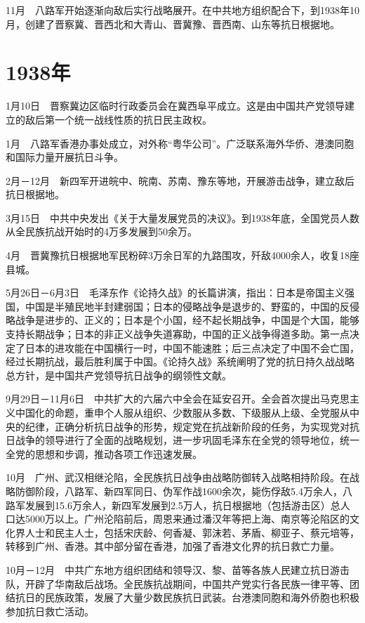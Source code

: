 \documentclass[10pt,a4paper,twocolumn]{book}
\begin{document}
11月　八路军开始逐渐向敌后实行战略展开。在中共地方组织配合下，到1938年10月，创建了晋察冀、晋西北和大青山、晋冀豫、晋西南、山东等抗日根据地。

\section{1938年}

1月10日　晋察冀边区临时行政委员会在冀西阜平成立。这是由中国共产党领导建立的敌后第一个统一战线性质的抗日民主政权。

1月　八路军香港办事处成立，对外称“粤华公司”。广泛联系海外华侨、港澳同胞和国际力量开展抗日斗争。

2月－12月　新四军开进皖中、皖南、苏南、豫东等地，开展游击战争，建立敌后抗日根据地。

3月15日　中共中央发出《关于大量发展党员的决议》。到1938年底，全国党员人数从全民族抗战开始时的4万多发展到50余万。

4月　晋冀豫抗日根据地军民粉碎3万余日军的九路围攻，歼敌4000余人，收复18座县城。

5月26日－6月3日　毛泽东作《论持久战》的长篇讲演，指出：日本是帝国主义强国，中国是半殖民地半封建弱国；日本的侵略战争是退步的、野蛮的，中国的反侵略战争是进步的、正义的；日本是个小国，经不起长期战争，中国是个大国，能够支持长期战争；日本的非正义战争失道寡助，中国的正义战争得道多助。第一点决定了日本的进攻能在中国横行一时，中国不能速胜；后三点决定了中国不会亡国，经过长期抗战，最后胜利属于中国。《论持久战》系统阐明了党的抗日持久战战略总方针，是中国共产党领导抗日战争的纲领性文献。

9月29日－11月6日　中共扩大的六届六中全会在延安召开。全会首次提出马克思主义中国化的命题，重申个人服从组织、少数服从多数、下级服从上级、全党服从中央的纪律，正确分析抗日战争的形势，规定党在抗战新阶段的任务，为实现党对抗日战争的领导进行了全面的战略规划，进一步巩固毛泽东在全党的领导地位，统一全党的思想和步调，推动各项工作迅速发展。

10月　广州、武汉相继沦陷，全民族抗日战争由战略防御转入战略相持阶段。在战略防御阶段，八路军、新四军同日、伪军作战1600余次，毙伤俘敌5.4万余人，八路军发展到15.6万余人，新四军发展到2.5万人，抗日根据地（包括游击区）总人口达5000万以上。广州沦陷前后，周恩来通过潘汉年等把上海、南京等沦陷区的文化界人士和民主人士，包括宋庆龄、何香凝、郭沫若、茅盾、柳亚子、蔡元培等，转移到广州、香港。其中部分留在香港，加强了香港文化界的抗日救亡力量。

10月－12月　中共广东地方组织团结和领导汉、黎、苗等各族人民建立抗日游击队，开辟了华南敌后战场。全民族抗战期间，中国共产党实行各民族一律平等、团结抗日的民族政策，发展了大量少数民族抗日武装。台港澳同胞和海外侨胞也积极参加抗日救亡活动。
\end{document}
